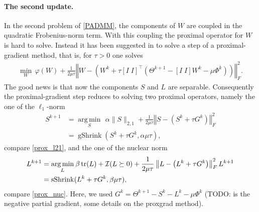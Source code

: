 \documentclass{article}
\newcommand{\bPr}[1]{\ensuremath{\left(#1 \right)}} %
\newcommand{\bNorm}[1]{\left\Vert #1\right\Vert} %
\DeclareMathOperator{\tr}{tr}
\DeclareMathOperator{\gshrink}{gShrink}
\DeclareMathOperator{\sshrink}{sShrink}
\DeclareMathOperator{\argmin}{arg\,min}
\begin{document}
\paragraph{The second update.}
In the second problem of \eqref{PADMM}, the components of $W$ are coupled in the quadratic Frobenius-norm term. With this coupling the proximal operator for $W$ is hard to solve.
Instead it has been suggested in \cite{ma2013alternating} to solve a step of a proximal-gradient method, that is, for $\tau>0$ one solves
\begin{align*}
	\min_W \,\varphi(W) + \frac{1}{2\mu\tau}\bNorm{W - \bPr{W^k + \tau[I\; I]^\top\bPr{\Theta^{k+1} - [I\; I]W^k - \mu\Phi^k}}}_F^2.
\end{align*}
The good news is that now the components $S$ and $L$ are separable. Consequently the proximal-gradient step reduces to solving two proximal operators, namely the one of the $\ell_1$-norm
\begin{align*}
	S^{k+1} &= \underset{S}{\argmin} \: \, \alpha \|S\|_{2,1} + \frac{1}{2\mu\tau}\bNorm{S - \bPr{S^k + \tau G^k}}_F^2
	\\& = \gshrink(S^k + \tau G^k, \alpha\mu\tau),
\end{align*}
compare \eqref{prox_l21}, and the one of the nuclear norm
\begin{align*}
	L^{k+1} &= \underset{L}{\argmin} \: \beta \tr(L) + \I(L\succeq0)+ \frac{1}{2\mu\tau}\bNorm{L - \bPr{L^k + \tau G^k}}_F^2 L^{k+1}
	\\& = \sshrink(L^k + \tau G^k, \beta\mu\tau),
\end{align*}
compare \eqref{prox_nuc}. Here, we used $G^k = \Theta^{k+1} - S^k - L^k - \mu\Phi^k$ (TODO: is the negative partial gradient, some details on the proxgrad method).
	
\end{document}
